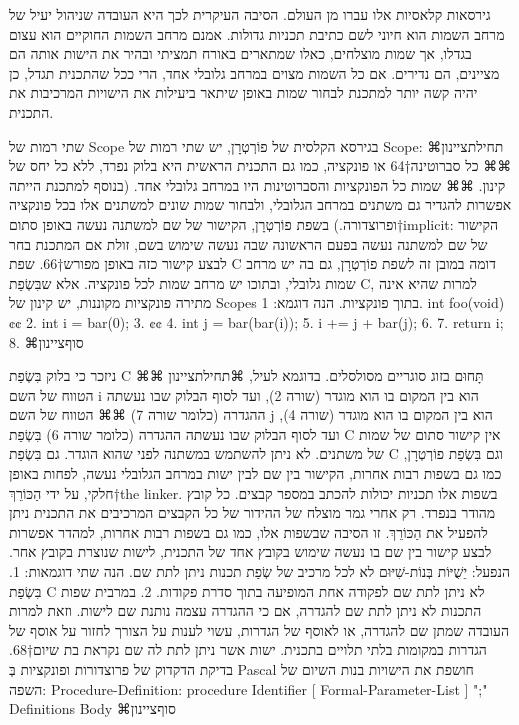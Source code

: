       גירסאות קלאסיות אלו עברו מן העולם. הסיבה העיקרית לכך היא העובדה שניהול
      יעיל של מרחב השמות הוא חיוני לשם כתיבת תכניות גדולות. אמנם מרחב השמות
      החוקיים הוא עצום בגדלו, אך שמות מוצלחים, כאלו שמתארים באורח תמציתי ובהיר
      את הישות אותה הם מציינים, הם נדירים. אם כל השמות מצוים במרחב גלובלי אחד,
      הרי ככל שהתכנית תגדל, כן יהיה קשה יותר למתכנת לבחור שמות באופן שיתאר
      ביעילות את הישויות המרכיבות את התכנית.

      שתי רמות של Scope
      בגירסא הקלסית של פוֹרְטְרָן, יש שתי רמות של Scope:
      ⌘תחילת{ציינון}
      ⌘⌘ כל סברוטינה†{64} או פונקציה, כמו גם התכנית הראשית היא בלוק נפרד, ללא כל יחס של קינון.
      ⌘⌘ שמות כל הפונקציות והסברוטינות היו במרחב גלובלי אחד.
      (בנוסף למתכנת הייתה אפשרות להגדיר גם משתנים במרחב הגלובלי, ולבחור שמות שונים למשתנים אלו בכל פונקציה ופרוצדורה.)
      בשפת פוֹרְטְרָן, הקישור של שם למשתנה נעשה באופן סתום†{implicit}: הקישור של שם למשתנה נעשה בפעם הראשונה שבה נעשה שימוש בשם, זולת אם המתכנת בחר לבצע קישור כזה באופן מפורש†{66}.
      שפת C דומה במובן זה לשפת פוֹרְטְרָן, גם בה יש מרחב שמות גלובלי, ובתוכו יש מרחב שמות לכל פונקציה. אלא שבִּשְׂפַת C, למרות שהיא אינה מתירה פונקציות מקוננות, יש קינון של Scopes בתוך פונקציות.
      הנה דוגמא:
      1. int foo(void) {¢¢
        2. int i = bar(0);
        3. {¢¢
          4. int j = bar(bar(i));
          5. i += j + bar(j);
        6. }
        7. return i;
      8. }
  ⌘סוף{ציינון}

      ניזכר כי בלוק בִּשְׂפַת C תָּחוּם בזוג סוגריים מסולסלים.
      בדוגמא לעיל,
      ⌘תחילת{ציינון}
      ⌘⌘ הטווח של השם i הוא בין המקום בו הוא מוגדר (שורה 2), ועד לסוף הבלוק שבו נעשתה ההגדרה (כלומר שורה 7)
      ⌘⌘ הטווח של השם j הוא בין המקום בו הוא מוגדר (שורה 4), ועד לסוף הבלוק שבו נעשתה ההגדרה (כלומר שורה 6)
      בִּשְׂפַת C אין קישור סתום של שמות של משתנים. לא ניתן להשתמש במשתנה לפני שהוא הוגדר.
      גם בִּשְׂפַת C וגם בִּשְׂפַת פוֹרְטְרָן, כמו גם בשפות רבות אחרות, הקישור בין שם לבין ישות במרחב הגלובלי נעשה, לפחות באופן חלקי, על ידי הַכּוֹרֵךְ†{the linker}. בשפות אלו תכניות יכולות להכתב במספר קבצים. כל קובץ מהודר בנפרד. רק אחרי גמר מוצלח של ההידור של כל הקבצים המרכיבים את התכנית ניתן להפעיל את הַכּוֹרֵךְ. זו הסיבה שבשפות אלו, כמו גם בשפות רבות אחרות, למהדר אפשרות לבצע קישור בין שם בו נעשה שימוש בקובץ אחד של התכנית, לישות שנוצרת בקובץ אחר.
      הנפעל: יֵשֻׁיּוֹת בְּנוֹת-שִׁיּוּם
      לא לכל מרכיב של שְׂפַת תכנות ניתן לתת שם. הנה שתי דוגמאות:
      1. בִּשְׂפַת C לא ניתן לתת שם לפקודה אחת המופיעה בתוך סדרת פקודות.
      2. במרבית שפות התכנות לא ניתן לתת שם להגדרה, אם כי ההגדרה עצמה נותנת שם לישות. וזאת למרות העובדה שמתן שם להגדרה, או לאוסף של הגדרות, עשוי לענות על הצורך לחזור על אוסף של הגדרות במקומות בלתי תלויים בתכנית.
      ישות אשר ניתן לתת לה שם נקראת בת שיום†{68}.
      בדיקת הדקדוק של פרוצדורות ופונקציות בְּ Pascal חושפת את הישויות בנות השיום של השפה:
      Procedure-Definition:
      procedure Identifier [ Formal-Parameter-List ] ";" Definitions Body
  ⌘סוף{ציינון}

